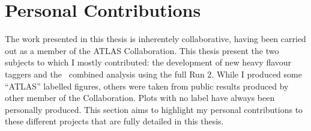 \chapter*{\color{oxfordblue} Personal Contributions}

The work presented in this thesis is inherentely collaborative, having been carried out as a member of the ATLAS Collaboration. This thesis present the two subjects to which I mostly contributed: the development of new heavy flavour taggers and the \vhbc\ combined analysis using the full Run 2. While I produced some ``ATLAS'' labelled figures, others were taken from public results produced by other member of the Collaboration. Plots with no label have always been personally produced. This section aims to highlight my personal contributions to these different projects that are fully detailed in this thesis.

